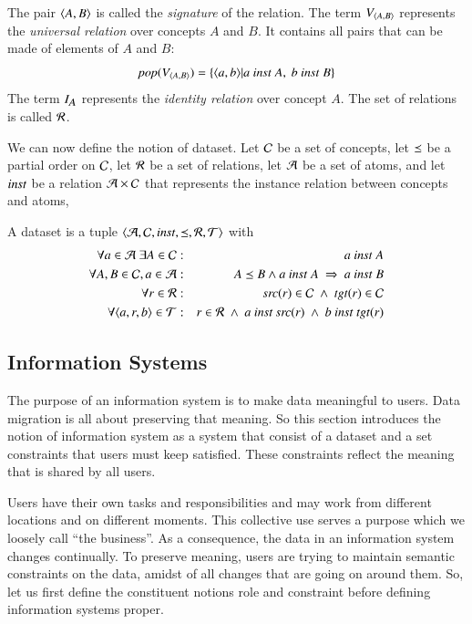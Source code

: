 \documentclass{elsarticle}
\begin{document}
	The pair $\langle{A},{B}\rangle$ is called the \emph{signature} of the relation.
	The term $V_{\langle{A},{B}\rangle}$ represents the \emph{universal relation} over concepts $A$ and $B$.
	It contains all pairs that can be made of elements of $A$ and $B$:
\[\pop{\fullt{A}{B}} = \{ \pair{a}{b}| a\ \inst\ A,\ b\ \inst\ B \}\]
	The term $I_{\text{\it \small A\/}}$ represents the \emph{identity relation} over concept $A$.
	The set of relations is called $\mathcal{R}$.
	
	We can now define the notion of dataset.
	Let	$\mathcal{C}$ be a set of concepts,
	let $\preceq$ be a partial order on $\mathcal{C}$,
	let $\mathcal{R}$ be a set of relations,
	let $\mathcal{A}$ be a set of atoms,
	and let $\text{\it inst\/}$ be a relation $\mathcal{A}\times\mathcal{C}$ that represents the instance relation between concepts and atoms,
\begin{definition}[dataset]
	\label{def:dataset}
	\item A dataset is a tuple $\langle\mathcal{A},\mathcal{C},\text{\it inst\/},\preceq,\mathcal{R},\mathcal{T}\rangle$ with
	\begin{eqnarray}
		\forall a\in\atoms\ \exists A\in\concepts&:&a\ \inst\ A\\
		\forall A,B\in\concepts, a\in\atoms&:&A\isa B\wedge a\ \inst\ A\ \Rightarrow\ a\ \inst\ B\\
		\forall r\in\rels&:&\src{r}\in\concepts\ \wedge\ \tgt{r}\in\concepts\\
		\forall\triple{a}{r}{b}\in\triples&:&r\in\rels\ \wedge\ a\ \inst\ \src{r}\ \wedge\ b\ \inst\ \tgt{r}
	\end{eqnarray}
\end{definition}

\subsection{Information Systems}
\label{sct:Information Systems}
	The purpose of an information system is to make data meaningful to users.
	Data migration is all about preserving that meaning.
	So this section introduces the notion of information system
	as a system that consist of a dataset and a set constraints that users must keep satisfied.
	These constraints reflect the meaning that is shared by all users.

	Users have their own tasks and responsibilities
	and may work from different locations and on different moments.
	This collective use serves a purpose which we loosely call ``the business''.
	As a consequence, the data in an information system changes continually.
	To preserve meaning, users are trying to maintain semantic constraints on the data,
	amidst of all changes that are going on around them.
	So, let us first define the constituent notions role and constraint before defining information systems proper.
\end{document}

